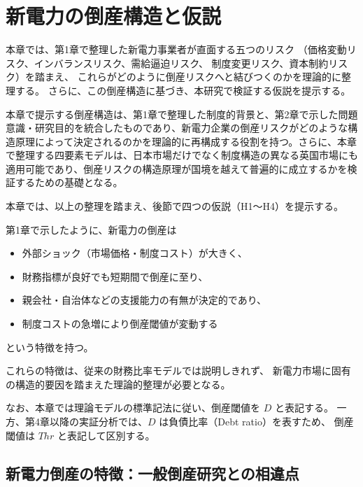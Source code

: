 
\chapter{新電力の倒産構造と仮説}
\label{chap:hypothesis}

本章では、第1章で整理した新電力事業者が直面する五つのリスク
（価格変動リスク、インバランスリスク、需給逼迫リスク、
制度変更リスク、資本制約リスク）を踏まえ、
これらがどのように倒産リスクへと結びつくのかを理論的に整理する。
さらに、この倒産構造に基づき、本研究で検証する仮説を提示する。

本章で提示する倒産構造は、第1章で整理した制度的背景と、第2章で示した問題意識・研究目的を統合したものであり、新電力企業の倒産リスクがどのような構造原理によって決定されるのかを理論的に再構成する役割を持つ。さらに、本章で整理する四要素モデルは、日本市場だけでなく制度構造の異なる英国市場にも適用可能であり、倒産リスクの構造原理が国境を越えて普遍的に成立するかを検証するための基礎となる。

本章では、以上の整理を踏まえ、後節で四つの仮説（H1〜H4）を提示する。

第1章で示したように、新電力の倒産は
\begin{itemize}
    \item 外部ショック（市場価格・制度コスト）が大きく、
    \item 財務指標が良好でも短期間で倒産に至り、
    \item 親会社・自治体などの支援能力の有無が決定的であり、
    \item 制度コストの急増により倒産閾値が変動する
\end{itemize}
という特徴を持つ。

これらの特徴は、従来の財務比率モデルでは説明しきれず、
新電力市場に固有の構造的要因を踏まえた理論的整理が必要となる。

なお、本章では理論モデルの標準記法に従い、倒産閾値を $D$ と表記する。
一方、第4章以降の実証分析では、$D$ は負債比率（Debt ratio）を表すため、
倒産閾値は $Thr$ と表記して区別する。


\section{新電力倒産の特徴：一般倒産研究との相違点}

